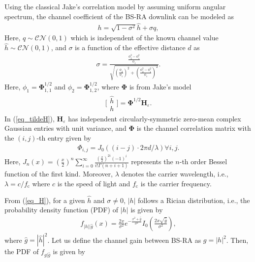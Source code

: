 Using the classical Jake's correlation model \cite[p. 2642]{Shin2003TITcapacity} by assuming uniform angular spectrum, the channel coefficient of the BS-RA downlink can be modeled as 
\begin{align}\label{eq_H}
    h = \sqrt{1-\sigma^2} \hat{h} + \sigma q,
\end{align}
Here, $q \sim \mathcal{CN}(0,1)$ which is independent of the known channel value $\hat{h}\sim \mathcal{CN}(0,1)$, and $\sigma$ is a function of the effective distance $d$ as 
\begin{align}
    \sigma = \frac{\frac{\phi_2^2-\phi_1^2}{\phi_1}}{\sqrt{ \left(\frac{\phi_2}{\phi_1}\right)^2 + \left(\frac{\phi_2^2-\phi_1^2}{\phi_1}\right)^2 }}.
\end{align}
Here, $\phi_1 = \bm{\Phi}_{1,1}^{1/2} $ and $\phi_2 = \bm{\Phi}_{1,2}^{1/2} $, where $\bm{\Phi}$ is  from Jake's model \cite[p. 2642]{Shin2003TITcapacity}
\begin{align}\label{eq_tildeH}
     \bigl[ \begin{smallmatrix}
  \hat{h}\\h
\end{smallmatrix} \bigr]= \bm{\Phi}^{1/2} \bm{H}_{\varepsilon}.
\end{align}
In (\ref{eq_tildeH}), $\bm{H}_{\varepsilon}$ has independent circularly-symmetric zero-mean complex Gaussian entries with unit variance, and $\bm{\Phi}$ is the channel correlation matrix with the $(i,j)$-th entry given by
\begin{align}\label{eq_phi}
    \Phi_{i,j} = J_0\left((i-j)\cdot2\pi d/ \lambda\right) \forall i,j.
\end{align}
Here, $J_n(x) = (\frac{x}{2})^n \sum_{i=0}^{\infty}\frac{(\frac{x}{2})^{2i}(-1)^{i} }{i!\Gamma(n+i+1)}$ represents the $n$-th order Bessel function of the first kind. Moreover, $\lambda$ denotes the carrier wavelength, i.e., $\lambda = c/f_\text{c}$ where $c$ is the speed of light and $f_\text{c}$ is the carrier frequency. 






From (\ref{eq_H}), for a given $\hat{h}$ and $\sigma \neq 0$, $|h|$ follows a Rician distribution, i.e., the  probability density function (PDF) of $|h|$ is given by 
\begin{align}
    f_{|h|\big|\hat{g}}(x) = \frac{2x}{\sigma^2}e^{-\frac{x^2+\hat{g}}{\sigma^2}}I_0\left(\frac{2x\sqrt{\hat{g}}}{\sigma^2}\right),
\end{align}
where $\hat{g} = |\hat{h}|^2$. Let us define the channel gain between BS-RA as $ g = |{h}|^2$. Then, the PDF of $f_{g|\hat{g}}$ is given by


